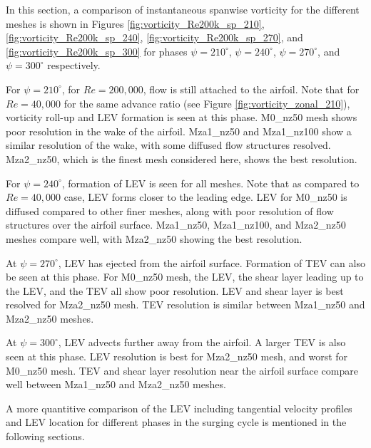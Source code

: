 In this section, a comparison of instantaneous spanwise vorticity for the different meshes is shown in Figures \ref{fig:vorticity_Re200k_sp_210}, \ref{fig:vorticity_Re200k_sp_240},  \ref{fig:vorticity_Re200k_sp_270}, and \ref{fig:vorticity_Re200k_sp_300} for phases $\psi=210^\circ$, $\psi=240^\circ$, $\psi=270^\circ$, and $\psi=300^\circ$ respectively. 

For $\psi=210^\circ$, for $Re=200,000$, flow is still attached to the airfoil. 
Note that for $Re=40,000$ for the same advance ratio (see Figure \ref{fig:vorticity_zonal_210}), vorticity roll-up and LEV formation is seen at this phase.
M0\_nz50 mesh shows poor resolution in the wake of the airfoil.
Mza1\_nz50 and Mza1\_nz100 show a similar resolution of the wake, with some diffused flow structures resolved.
Mza2\_nz50, which is the finest mesh considered here, shows the best resolution. 

For $\psi=240^\circ$, formation of LEV is seen for all meshes.
Note that as compared to $Re=40,000$ case, LEV forms closer to the leading edge.
LEV for M0\_nz50 is diffused compared to other finer meshes, along with poor resolution of flow structures over the airfoil surface.
Mza1\_nz50, Mza1\_nz100, and Mza2\_nz50 meshes compare well, with Mza2\_nz50 showing the best resolution.


At $\psi=270^\circ$, LEV has ejected from the airfoil surface. 
Formation of TEV can also be seen at this phase.
For M0\_nz50 mesh, the LEV, the shear layer leading up to the LEV, and the TEV all show poor resolution.
LEV and shear layer is best resolved for Mza2\_nz50 mesh.
TEV resolution is similar between Mza1\_nz50 and Mza2\_nz50 meshes.


At $\psi=300^\circ$, LEV advects further away from the airfoil. A larger TEV is also seen at this phase.
LEV resolution is best for Mza2\_nz50 mesh, and worst for M0\_nz50 mesh. 
TEV and shear layer resolution near the airfoil surface compare well between Mza1\_nz50 and Mza2\_nz50 meshes.


A more quantitive comparison of the LEV including tangential velocity profiles and LEV location for different phases in the surging cycle is mentioned in the following sections.




